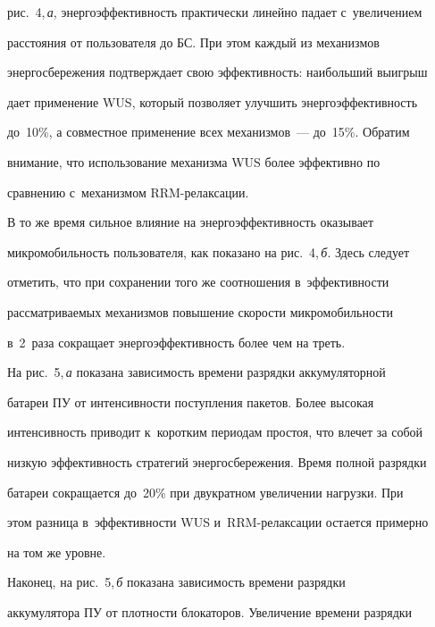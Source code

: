 рис.~4,\,\textit{а}, энергоэффективность практически линейно падает с~увеличением 


расстояния от пользователя до БС. При этом каждый из механизмов 


энергосбережения подтверждает свою эффективность: наибольший выигрыш 


дает применение WUS, который позволяет улучшить энергоэффективность 


до~10\%, а совместное применение всех механизмов~--- до~15\%. Обратим 


внимание, что использование механизма WUS более эффективно по 


сравнению с~механизмом RRM-ре\-лак\-са\-ции.


     


     В то же время сильное влияние на энергоэффективность оказывает 


микромобильность пользователя, как показано на рис.~4,\,\textit{б}. Здесь следует 


отметить, что при сохранении того же соотношения в~эффективности 


рассматриваемых механизмов повышение скорости микромобильности 


в~2~раза сокращает энергоэффективность более чем на треть.


     





     


     На рис.~5,\,\textit{а} показана зависимость времени разрядки аккумуляторной 


батареи ПУ от интенсивности поступления пакетов. Более высокая 


интенсивность приводит к~коротким периодам простоя, что влечет за собой 


низкую эффективность стратегий энергосбережения. Время полной разрядки 


батареи сокращается до~20\% при двукратном увеличении нагрузки. При 


этом разница в~эффективности WUS и~RRM-релаксации остается примерно 


на том же уровне.


     


     Наконец, на рис.~5,\,\textit{б} показана зависимость времени разрядки 


аккумулятора ПУ от плотности блокаторов. Увеличение времени разрядки 


